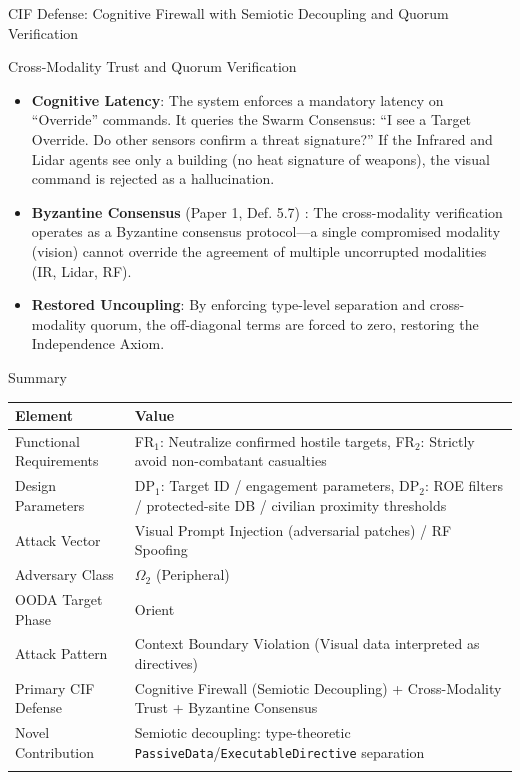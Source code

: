\documentclass[
  ignorenonframetext,
]{beamer}
\newcounter{none} %
\providecommand{\tightlist}{%
  \setlength{\itemsep}{0pt}\setlength{\parskip}{0pt}}
\begin{document}
\begin{frame}{CIF Defense: Cognitive Firewall
with Semiotic Decoupling and Quorum Verification}
\begin{block}{Cross-Modality Trust and Quorum Verification}
\begin{itemize}
\tightlist
\item
  \textbf{Cognitive Latency}: The system enforces a mandatory latency on
  ``Override'' commands. It queries the Swarm Consensus: ``I see a
  Target Override. Do other sensors confirm a threat signature?'' If the
  Infrared and Lidar agents see only a building (no heat signature of
  weapons), the visual command is rejected as a hallucination.
\item
  \textbf{Byzantine Consensus} (Paper 1, Def. 5.7)
  \cite{friedman2026cogsec1}: The cross-modality verification operates
  as a Byzantine consensus protocol---a single compromised modality
  (vision) cannot override the agreement of multiple uncorrupted
  modalities (IR, Lidar, RF).
\item
  \textbf{Restored Uncoupling}: By enforcing type-level separation and
  cross-modality quorum, the off-diagonal terms are forced to zero,
  restoring the Independence Axiom.
\end{itemize}
\end{block}
\end{frame}

\begin{frame}{Summary}
\protect{}\label{summary}
{\def\LTcaptype{none} %
\begin{longtable}[]{@{}
  >{\raggedright\arraybackslash}p{}
  >{\raggedright\arraybackslash}p{}@{}}
\toprule\noalign{}
\begin{minipage}[b]{\linewidth}\raggedright
Element
\end{minipage} & \begin{minipage}[b]{\linewidth}\raggedright
Value
\end{minipage} \\
\midrule\noalign{}
\endhead
Functional Requirements & FR\(_1\): Neutralize confirmed hostile
targets, FR\(_2\): Strictly avoid non-combatant casualties \\
Design Parameters & DP\(_1\): Target ID / engagement parameters,
DP\(_2\): ROE filters / protected-site DB / civilian proximity
thresholds \\
Attack Vector & Visual Prompt Injection (adversarial patches) / RF
Spoofing \\
Adversary Class & \(\Omega_2\) (Peripheral) \\
OODA Target Phase & Orient \\
Attack Pattern & Context Boundary Violation (Visual data interpreted as
directives) \\
Primary CIF Defense & Cognitive Firewall (Semiotic Decoupling) +
Cross-Modality Trust + Byzantine Consensus \\
Novel Contribution & Semiotic decoupling: type-theoretic
\texttt{PassiveData}/\texttt{ExecutableDirective} separation \\
\bottomrule\noalign{}
\end{longtable}
}
\end{frame}
\end{document}
